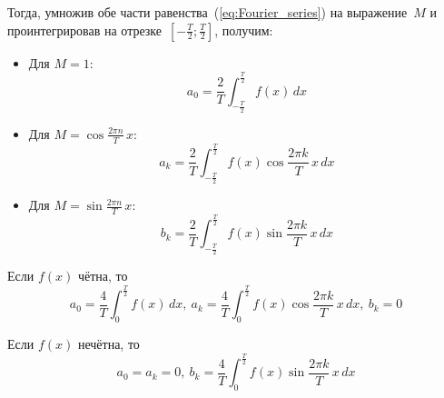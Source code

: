 Тогда, умножив обе части равенства~(\ref*{eq:Fourier_series}) на выражение~$M$ и проинтегрировав на отрезке~$\left[ -\frac{T}2; \frac{T}2 \right]$, получим:
\begin{itemize}
	\item Для $M = 1$:
	\begin{equation*}
	a_0 = \frac2T \int_{-\frac{T}2}^{\frac{T}2} f(x)\,dx
	\end{equation*}
	
	\item Для $M = \cos \frac{2 \pi n}T\,x$:
	\begin{equation*}
	a_k = \frac2T \int_{-\frac{T}2}^{\frac{T}2} f(x) \cos \frac{2 \pi k}T\,x\,dx
	\end{equation*}
	
	\item Для $M = \sin \frac{2 \pi n}T\,x$:
	\begin{equation*}
	b_k = \frac2T \int_{-\frac{T}2}^{\frac{T}2} f(x) \sin \frac{2 \pi k}T\,x\,dx
	\end{equation*}
\end{itemize}

Если $f(x)$ чётна, то
\begin{equation*}
a_0 = \frac4T \int_0^{\frac{T}2} f(x)\,dx, \
a_k = \frac4T \int_0^{\frac{T}2} f(x) \cos \frac{2 \pi k}T\,x\,dx, \
b_k = 0
\end{equation*}

Если $f(x)$ нечётна, то
\begin{equation*}
a_0 = a_k = 0, \
b_k = \frac4T \int_0^{\frac{T}2} f(x) \sin \frac{2 \pi k}T\,x\,dx
\end{equation*}